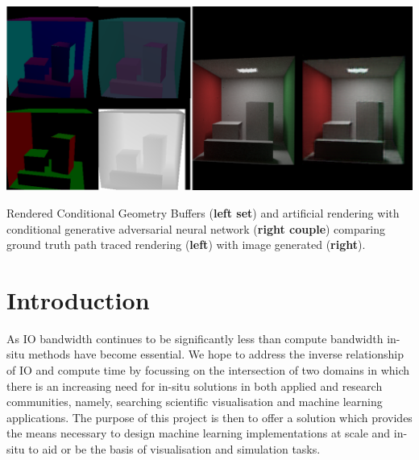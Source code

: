 \documentclass[sigconf,authordraft]{acmart}%
\begin{document}
\begin{teaserfigure}
  \includegraphics[width=\textwidth]{buffer_results_teaser.png}
  \caption{\textmd{Rendered Conditional Geometry Buffers ({\bf left set}) and artificial rendering with conditional generative adversarial neural network ({\bf right couple}) comparing ground truth path traced rendering ({\bf left}) with image generated ({\bf right}).}}
  \label{teaser}
\end{teaserfigure}

\maketitle


\section{Introduction}

As IO bandwidth continues to be significantly less than compute bandwidth in-situ methods have become essential. We hope to address the inverse relationship of IO and compute time by focussing on the intersection of two domains in which there is an increasing need for in-situ solutions in both applied and research communities, namely, searching scientific visualisation and machine learning applications. The purpose of this project is then to offer a solution which provides the means necessary to design machine learning implementations at scale and in-situ to aid or be the basis of visualisation and simulation tasks.
\end{document}
